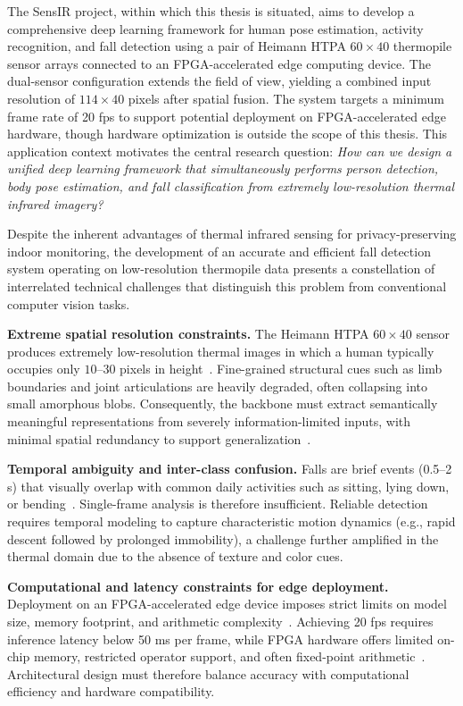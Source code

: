 The SensIR project, within which this thesis is situated, aims to develop a comprehensive deep learning framework for human pose estimation, activity recognition, and fall detection using a pair of Heimann HTPA $60 \times 40$ thermopile sensor arrays connected to an FPGA-accelerated edge computing device. The dual-sensor configuration extends the field of view, yielding a combined input resolution of $114 \times 40$ pixels after spatial fusion. The system targets a minimum frame rate of 20 fps to support potential deployment on FPGA-accelerated edge hardware, though hardware optimization is outside the scope of this thesis. This application context motivates the central research question: \textit{How can we design a unified deep learning framework that simultaneously performs person detection, body pose estimation, and fall classification from extremely low-resolution thermal infrared imagery?}

Despite the inherent advantages of thermal infrared sensing for privacy-preserving indoor monitoring, the development of an accurate and efficient fall detection system operating on low-resolution thermopile data presents a constellation of interrelated technical challenges that distinguish this problem from conventional computer vision tasks.

\textbf{Extreme spatial resolution constraints.} The Heimann HTPA $60 \times 40$ sensor produces extremely low-resolution thermal images in which a human typically occupies only $10$--$30$ pixels in height~\cite{nogas2020fall}. Fine-grained structural cues such as limb boundaries and joint articulations are heavily degraded, often collapsing into small amorphous blobs. Consequently, the backbone must extract semantically meaningful representations from severely information-limited inputs, with minimal spatial redundancy to support generalization~\cite{chen2019drop}.

\textbf{Temporal ambiguity and inter-class confusion.} Falls are brief events (0.5--2 s) that visually overlap with common daily activities such as sitting, lying down, or bending~\cite{fan2017fall,mubashir2013survey}. Single-frame analysis is therefore insufficient. Reliable detection requires temporal modeling to capture characteristic motion dynamics (e.g., rapid descent followed by prolonged immobility), a challenge further amplified in the thermal domain due to the absence of texture and color cues.

\textbf{Computational and latency constraints for edge deployment.} Deployment on an FPGA-accelerated edge device imposes strict limits on model size, memory footprint, and arithmetic complexity~\cite{sze2017efficient,chen2019drop}. Achieving 20 fps requires inference latency below 50 ms per frame, while FPGA hardware offers limited on-chip memory, restricted operator support, and often fixed-point arithmetic~\cite{guo2019survey}. Architectural design must therefore balance accuracy with computational efficiency and hardware compatibility.


